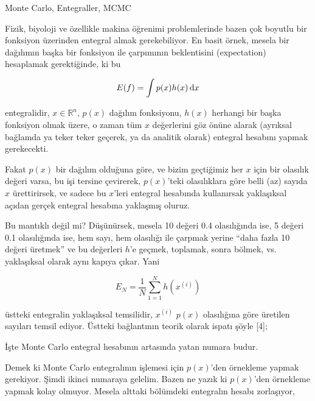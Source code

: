 \documentclass[12pt,fleqn]{article}\usepackage{../../common}
\begin{document}
Monte Carlo, Entegraller, MCMC

Fizik, biyoloji ve özellikle makina öğrenimi problemlerinde bazen çok
boyutlu bir fonksiyon üzerinden entegral almak gerekebiliyor. En basit
örnek, mesela bir dağılımın başka bir fonksiyon ile çarpımının beklentisini
(expectation) hesaplamak gerektiğinde, ki bu

$$ E(f) = \int p(x)h(x) \,\mathrm{d} x $$

entegralidir, $x \in \mathbb{R}^n$, $p(x)$ dağılım fonksiyonu, $h(x)$
herhangi bir başka fonksiyon olmak üzere, o zaman tüm $x$ değerlerini göz
önüne alarak (ayrıksal bağlamda ya teker teker geçerek, ya da analitik
olarak) entegral hesabını yapmak gerekecekti.

Fakat $p(x)$ bir dağılım olduğuna göre, ve bizim geçtiğimiz her $x$ için
bir olasılık değeri varsa, bu işi tersine çevirerek, $p(x)$'teki
olasılıklara göre belli (az) sayıda $x$ ürettirirsek, ve sadece bu $x$'leri
entegral hesabında kullanırsak yaklaşıksal açıdan gerçek entegral hesabına
yaklaşmış oluruz. 

Bu mantıklı değil mi? Düşünürsek, mesela 10 değeri 0.4 olasılığında ise, 5
değeri 0.1 olasılığında ise, hem sayı, hem olasılığı ile çarpmak yerine
``daha fazla 10 değeri üretmek'' ve bu değerleri $h$'e geçmek, toplamak,
sonra bölmek, vs. yaklaşıksal olarak aynı kapıya çıkar. Yani

$$ E_N = \frac{1}{N}\sum_{1=1}^N h(x^{(i)}) $$

üstteki entegralin yaklaşıksal temsilidir, $x^{(i)}$ $p(x)$ olasılığına
göre üretilen sayıları temsil ediyor. Üstteki bağlantının teorik olarak
ispatı şöyle [4];




























İşte Monte Carlo entegral hesabının artasında yatan numara budur. 

Demek ki Monte Carlo entegralının işlemesi için $p(x)$'den örnekleme yapmak
gerekiyor. Şimdi ikinci numaraya gelelim.  Bazen ne yazık ki $p(x)$'den
örnekleme yapmak kolay olmuyor. Mesela alttaki bölümdeki entegralın hesabı
zorlaşıyor,
\end{document}
